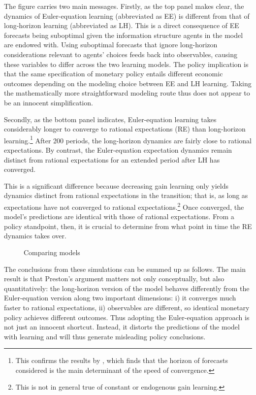 \documentclass[11pt]{article}
\def \myFigPath {../../figures/}
\renewcommand{\[}{\begin{equation}}
\renewcommand{\]}{\end{equation}}
\def\myFigScale{0.3}
\begin{document}
The figure carries two main messages. Firstly, as the top panel makes clear, the dynamics of Euler-equation learning (abbreviated as EE) is different from that of long-horizon learning (abbreviated as LH). This is a direct consequence of EE forecasts being suboptimal given the information structure agents in the model are endowed with. Using suboptimal forecasts that ignore long-horizon considerations relevant to agents' choices feeds back into observables, causing these variables to differ across the two learning models. The policy implication is that the same specification of monetary policy entails different economic outcomes depending on the modeling choice between EE and LH learning. Taking the mathematically more straightforward modeling route thus does not appear to be an innocent simplification.

Secondly, as the bottom panel indicates, Euler-equation learning takes considerably longer to converge to rational expectations (RE) than long-horizon learning.\footnote{This confirms the results by \cite{graham2011individual}, which finds that the horizon of forecasts considered is the main determinant of the speed of convergence.} After 200 periods, the long-horizon dynamics are fairly close to rational expectations. By contrast, the Euler-equation expectation dynamics remain distinct from rational expectations for an extended period after LH has converged. 

This is a significant difference because decreasing gain learning only yields dynamics distinct from rational expectations in the transition; that is, as long as expectations have not converged to rational expectations.\footnote{This is not in general true of constant or endogenous gain learning.} Once converged, the model's predictions are identical with those of rational expectations. From a policy standpoint, then, it is crucial to determine from what point in time the RE dynamics takes over. 

\begin{figure}[h!]
\caption{Comparing models}
\label{main}
\end{figure}


The conclusions from these simulations can be summed up as follows. The main result is that Preston's argument matters not only conceptually, but also quantitatively: the long-horizon version of the model behaves differently from the Euler-equation version along two important dimensions: i) it converges much faster to rational expectations, ii) observables are different, so identical monetary policy achieves different outcomes. Thus adopting the Euler-equation approach is not just an innocent shortcut. Instead, it distorts the predictions of the model with learning and will thus generate misleading policy conclusions.
\end{document}
